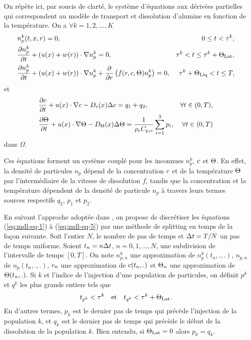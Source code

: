 On répète ici, par soucis de clarté, le système d'équations aux
dérivées partielles qui correspondent au modèle de transport et
dissolution d'alumine en fonction de la température. On a $\forall k =
1, 2, \dots, K$
\begin{align}
  & n_p^k(t, x, r) = 0,
  & 0\leq t < \tau^k,\label{eq:mdl-eq-1}\\
%
  & \frac{\partial n_p^k}{\partial t} + \parent{u(x) + w(r)}\cdot \nabla  n_p^k = 0,
  & \tau^k < t \leq \tau^k + \tlat,\label{eq:mdl-eq-2}\\
%
  & \frac{\partial n_p^k}{\partial t} + \parent{u(x) + w(r)}\cdot \nabla  n_p^k + \frac{\partial }{\partial r}\parent{f(r, \concentration, \temperature)n_p^k} = 0,
  & \tau^k + \tliq < t \leq \tend,\label{eq:mdl-eq-3}
\end{align}
et
\begin{align}
  & \frac{\partial \concentration}{\partial t} + u(x)\cdot\nabla \concentration - \cdiffusivity(x) \Delta \concentration = q_1 + q_2,
  & \forall t\in (0, T),\label{eq:mdl-eq-4}\\
%
  & \frac{\partial \temperature}{\partial t} + u(x)\cdot\nabla\temperature - \electrolytetdiff(x)\Delta \temperature = \frac{1}{\electrolytedensity\electrolytehc}\sum_{i = 1}^{3}p_i,
  & \forall t\in(0, T)\label{eq:mdl-eq-5}
\end{align}
dans $\Omega$.

Ces équations forment un système couplé pour les inconnues $n_p^k$,
$c$ et $\Theta$. En effet, la densité de
particules $n_p$ dépend de la concentration $c$ et de
la température $\Theta$ par l'intermédiaire de la vitesse de
dissolution $f$, tandis que la concentration et la température
dépendent de la densité de particule $n_p$ à travers leurs termes
sources respectifs $q_2$, $p_1$ et $p_2$.

En suivant l'approche adoptée dans \cite{Hofer2011}, on propose de
discrétiser les équations (\ref{eq:mdl-eq-1}) à (\ref{eq:mdl-eq-5})
par une méthode de splitting en temps de la façon suivante. Soit
l'entier $N$, le nombre de pas de temps et $\Delta t = T/N$ un pas de temps
uniforme. Soient $t_n = n\Delta t$, $n = 0, 1, \dots, N$, une subdivision de
l'intervalle de temps $[0, T]$. On note $n_{p,n}^k$ une approximation
de $n_p^k(t_n, ., .)$, $n_{p,n}$ de $n_p(t_n, ., .)$, $c_n$ une approximation de
$c(t_n, .)$ et $\Theta_n$ une approximation de
$\Theta(t_n, .)$. Si $k$ et l'indice de l'injection d'une
population de particules, on définit $p^k$ et $q^k$ les plus grands
entiers tels que
\begin{equation}
  t_{p^k} < \tau^k \quad\text{et}\quad t_{q^k} < \tau^k + \Theta_\text{Lat}.
\end{equation}
En d'autres termes, $p_k$ est le dernier pas de temps qui précède
l'injection de la population $k$, et $q_k$ est le dernier pas de temps
qui précède le début de la dissolution de la population $k$. Bien
entendu, si $\Theta_\text{Lat} = 0$ alors $p_k = q_k$.

